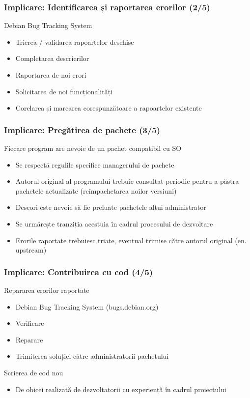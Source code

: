 \documentclass[xcolor=dvipsnames]{beamer}
\begin{document}
\begin{frame}
\frametitle{Implicare: Identificarea și raportarea erorilor (2/5)}
\begin{block}{}
Debian Bug Tracking System\\
\begin{itemize}
\item Trierea / validarea rapoartelor deschise
\item Completarea descrierilor
\item Raportarea de noi erori
\item Solicitarea de noi funcționalități
\item Corelarea și marcarea corespunzătoare a rapoartelor existente
\end{itemize}
\end{block}
\end{frame}

\begin{frame}
\frametitle{Implicare: Pregătirea de pachete (3/5)}
\begin{block}{}
Fiecare program are nevoie de un pachet compatibil cu SO\\
\begin{itemize}
\item Se respectă regulile specifice managerului de pachete
\item Autorul original al programului trebuie consultat periodic pentru a păstra pachetele actualizate (reîmpachetarea noilor versiuni)
\item Deseori este nevoie să fie preluate pachetele altui administrator
\item Se urmărește tranziția acestuia în cadrul procesului de dezvoltare
\item Erorile raportate trebuiesc triate, eventual trimise către autorul original (en. upstream)
\end{itemize}
\end{block}
\end{frame}

\begin{frame}
\frametitle{Implicare: Contribuirea cu cod (4/5)}
\begin{block}{}
Repararea erorilor raportate\\
\begin{itemize}
\item Debian Bug Tracking System (bugs.debian.org)
\item Verificare
\item Reparare
\item Trimiterea soluției către administratorii pachetului
\end{itemize}
\end{block}
\begin{block}{}
Scrierea de cod nou\\
\begin{itemize}
\item De obicei realizată de dezvoltatorii cu experiență în cadrul proiectului
\end{itemize}
\end{block}
\end{frame}
\end{document}
